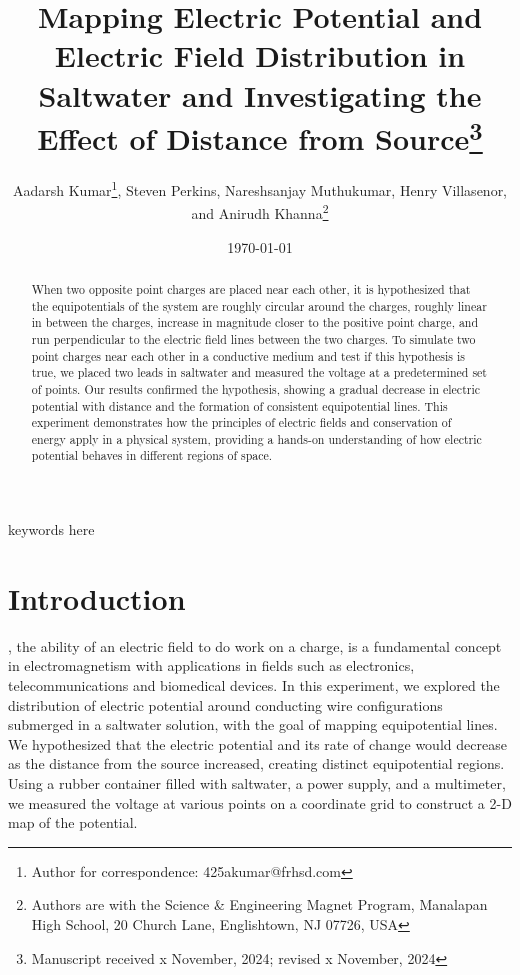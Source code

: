 ﻿\documentclass[10pt,journal]{IEEEtran}
\title{Mapping Electric Potential and Electric Field Distribution in Saltwater and Investigating the Effect of Distance from Source\thanks{Manuscript received x November, 2024; revised x November, 2024}}
\author{Aadarsh Kumar\thanks{Author for correspondence: 425akumar@frhsd.com}, Steven Perkins, Nareshsanjay Muthukumar, Henry Villasenor, and Anirudh Khanna\thanks{Authors are with the Science \& Engineering Magnet Program, Manalapan High School, 20 Church Lane, Englishtown, NJ 07726, USA}}
\date{\today}
\begin{document}
\maketitle

\begin{abstract}
When two opposite point charges are placed near each other, it is hypothesized that the equipotentials of the system are roughly circular around the charges, roughly linear in between the charges, increase in magnitude closer to the positive point charge, and run perpendicular to the electric field lines between the two charges. To simulate two point charges near each other in a conductive medium and test if this hypothesis is true, we placed two leads in saltwater and measured the voltage at a predetermined set of points. Our results confirmed the hypothesis, showing a gradual decrease in electric potential with distance and the formation of consistent equipotential lines. This experiment demonstrates how the principles of electric fields and conservation of energy apply in a physical system, providing a hands-on understanding of how electric potential behaves in different regions of space.
\end{abstract}

\begin{IEEEkeywords}
keywords here
\end{IEEEkeywords}

\section{Introduction}
, the ability of an electric field to do work on a charge, is a fundamental concept in electromagnetism with applications in fields such as electronics, telecommunications and biomedical devices. In this experiment, we explored the distribution of electric potential around conducting wire configurations submerged in a saltwater solution, with the goal of mapping equipotential lines. We hypothesized that the electric potential and its rate of change would decrease as the distance from the source increased, creating distinct equipotential regions. Using a rubber container filled with saltwater, a power supply, and a multimeter, we measured the voltage at various points on a coordinate grid to construct a 2-D map of the potential.
 
 
 
 
 
 
\end{document}
